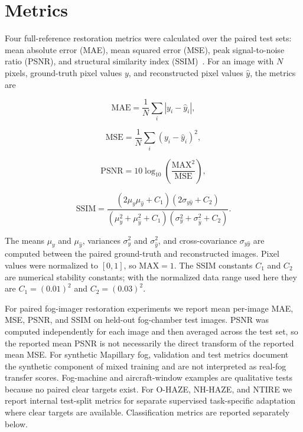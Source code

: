 \documentclass[9pt]{osa-supplemental-document}
\begin{document}
\section{Metrics}
\label{secS:metrics}

Four full-reference restoration metrics were calculated over the paired test sets: mean absolute error (MAE), mean squared error (MSE), peak signal-to-noise ratio (PSNR), and structural similarity index (SSIM)~\cite{wang2004ssim}. For an image with $N$ pixels, ground-truth pixel values $y$, and reconstructed pixel values $\hat{y}$, the metrics are

\begin{equation}
\mathrm{MAE} = \frac{1}{N} \sum_i \left| y_i - \hat{y}_i \right| ,
\label{eqS:mae}
\end{equation}

\begin{equation}
\mathrm{MSE} = \frac{1}{N} \sum_i \left( y_i - \hat{y}_i \right)^2 ,
\label{eqS:mse}
\end{equation}

\begin{equation}
\mathrm{PSNR} = 10 \log_{10} \left( \frac{\mathrm{MAX}^2}{\mathrm{MSE}} \right) ,
\label{eqS:psnr}
\end{equation}

\begin{equation}
\mathrm{SSIM} =
\frac{(2\mu_y \mu_{\hat{y}} + C_1)(2\sigma_{y\hat{y}} + C_2)}
{(\mu_y^2 + \mu_{\hat{y}}^2 + C_1)(\sigma_y^2 + \sigma_{\hat{y}}^2 + C_2)} .
\label{eqS:ssim}
\end{equation}

The means $\mu_y$ and $\mu_{\hat{y}}$, variances $\sigma_y^2$ and $\sigma_{\hat{y}}^2$, and cross-covariance $\sigma_{y\hat{y}}$ are computed between the paired ground-truth and reconstructed images. Pixel values were normalized to $[0,1]$, so $\mathrm{MAX}=1$. The SSIM constants $C_1$ and $C_2$ are numerical stability constants; with the normalized data range used here they are $C_1=(0.01)^2$ and $C_2=(0.03)^2$.

For paired fog-imager restoration experiments we report mean
per-image MAE, MSE, PSNR, and SSIM on held-out fog-chamber test
images. PSNR was computed independently for each image and then
averaged across the test set, so the reported mean PSNR is not
necessarily the direct transform of the reported mean MSE. For
synthetic Mapillary fog, validation and test metrics document the
synthetic component of mixed training and are not interpreted as
real-fog transfer scores. Fog-machine and aircraft-window examples
are qualitative tests because no paired clear targets exist. For
O-HAZE, NH-HAZE, and NTIRE we report internal test-split metrics for
separate supervised task-specific adaptation where clear targets are
available. Classification metrics are reported separately below.
\end{document}
